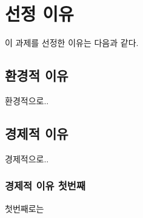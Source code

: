 \documentclass{article}
\begin{document}
\section{선정 이유}
이 과제를 선정한 이유는 다음과 같다. 

\subsection{환경적 이유}
환경적으로.. 

\subsection{경제적 이유}
경제적으로.. 

\subsubsection{경제적 이유 첫번째}
첫번째로는
\end{document}

